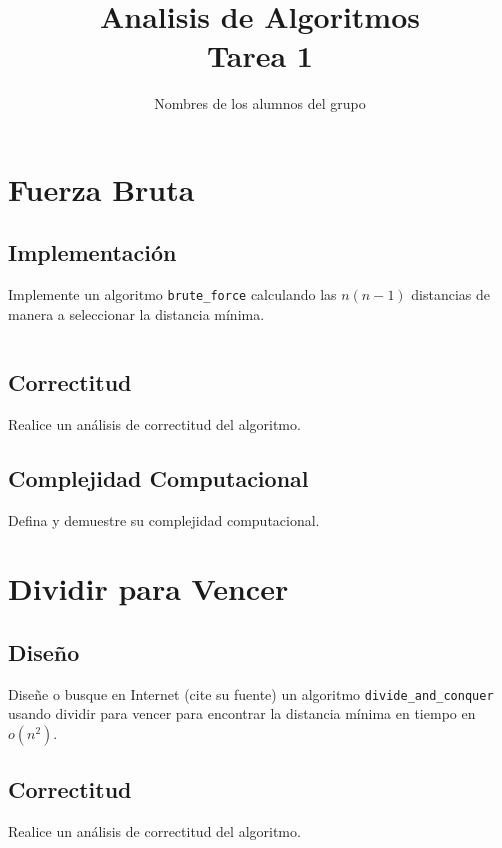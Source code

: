 \documentclass{article}
\begin{document}
\title{Analisis de Algoritmos \\ Tarea 1}
\author{Nombres de los alumnos del grupo}

\maketitle


\section{Fuerza Bruta}

\subsection{Implementación}
  Implemente un algoritmo \texttt{brute\_force} calculando las $n(n-1)$ distancias de manera a seleccionar la distancia mínima.  
\begin{lstlisting}
\end{lstlisting}

\subsection{Correctitud}
Realice un análisis de correctitud del algoritmo.

\subsection{Complejidad Computacional}
Defina y demuestre su complejidad computacional. 
  
\section{Dividir para Vencer}

\subsection{Diseño}

Diseñe o busque en Internet (cite su fuente) un algoritmo \texttt{divide\_and\_conquer} usando dividir para vencer para encontrar la distancia mínima en tiempo en $o(n^2)$.

\subsection{Correctitud}
Realice un análisis de correctitud del algoritmo.
\end{document}
